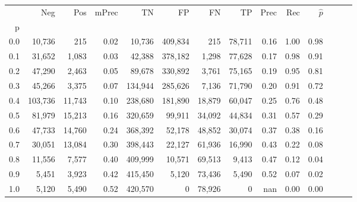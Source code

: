 \begin{tabular}{rrrrrrrrrrrrrr}
\toprule
{} &      Neg &     Pos & mPrec &       TN &       FP &      FN &      TP &  Prec &   Rec & $\hat{p}$ \\
p   &          &         &       &          &          &         &         &       &       &           \\
\midrule
0.0 &   10,736 &     215 &  0.02 &   10,736 &  409,834 &     215 &  78,711 &  0.16 &  1.00 &      0.98 \\
0.1 &   31,652 &   1,083 &  0.03 &   42,388 &  378,182 &   1,298 &  77,628 &  0.17 &  0.98 &      0.91 \\
0.2 &   47,290 &   2,463 &  0.05 &   89,678 &  330,892 &   3,761 &  75,165 &  0.19 &  0.95 &      0.81 \\
0.3 &   45,266 &   3,375 &  0.07 &  134,944 &  285,626 &   7,136 &  71,790 &  0.20 &  0.91 &      0.72 \\
0.4 &  103,736 &  11,743 &  0.10 &  238,680 &  181,890 &  18,879 &  60,047 &  0.25 &  0.76 &      0.48 \\
0.5 &   81,979 &  15,213 &  0.16 &  320,659 &   99,911 &  34,092 &  44,834 &  0.31 &  0.57 &      0.29 \\
0.6 &   47,733 &  14,760 &  0.24 &  368,392 &   52,178 &  48,852 &  30,074 &  0.37 &  0.38 &      0.16 \\
0.7 &   30,051 &  13,084 &  0.30 &  398,443 &   22,127 &  61,936 &  16,990 &  0.43 &  0.22 &      0.08 \\
0.8 &   11,556 &   7,577 &  0.40 &  409,999 &   10,571 &  69,513 &   9,413 &  0.47 &  0.12 &      0.04 \\
0.9 &    5,451 &   3,923 &  0.42 &  415,450 &    5,120 &  73,436 &   5,490 &  0.52 &  0.07 &      0.02 \\
1.0 &    5,120 &   5,490 &  0.52 &  420,570 &        0 &  78,926 &       0 &   nan &  0.00 &      0.00 \\
\bottomrule
\end{tabular}
